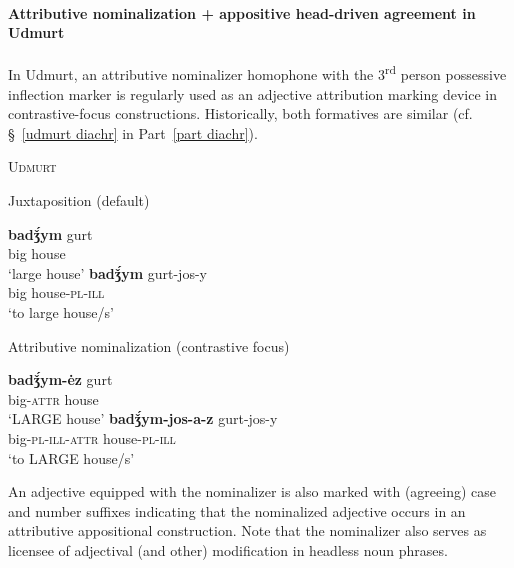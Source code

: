 \paragraph{Attributive nominalization + appositive head-driven agreement in Udmurt} \label{udmurt synchr}
In Udmurt, an attributive nominalizer homophone with the 3\textsuperscript{rd} person possessive inflection marker is regularly used as an adjective attribution marking device in contrastive-focus constructions. Historically, both formatives are similar (cf. \S~\ref{udmurt diachr} in Part~\ref{part diachr}).
\begin{exe}
\ex \textsc{Udmurt} \citep{winkler2001}
\begin{xlist}
\ex	Juxtaposition (default)
\begin{xlist}
\ex
\gll	\textbf{badǯ́ym} gurt\\
	big house\\
\glt	‘large house’
\ex	
\gll	\textbf{badǯ́ym} gurt-jos-y\\
	big house-\textsc{pl}-\textsc{ill}\\
\glt	‘to large house/s’
\end{xlist}
\ex	Attributive nominalization (contrastive focus)
\begin{xlist}
\ex
\gll	\textbf{badǯ́ym-ėz} gurt\\
	big-\textsc{attr} house\\
\glt	‘LARGE house’
\ex	
\gll	\textbf{badǯ́ym-jos-a-z} gurt-jos-y\\
	big-\textsc{pl}-\textsc{ill}-\textsc{attr} house-\textsc{pl}-\textsc{ill}\\
\glt	‘to LARGE house/s’
\end{xlist}
\end{xlist}
\end{exe}
An adjective equipped with the nominalizer is also marked with (agreeing) case and number suffixes indicating that the nominalized adjective occurs in an attributive appositional construction. Note that the nominalizer also serves as licensee of adjectival (and other) modification in headless noun phrases.
